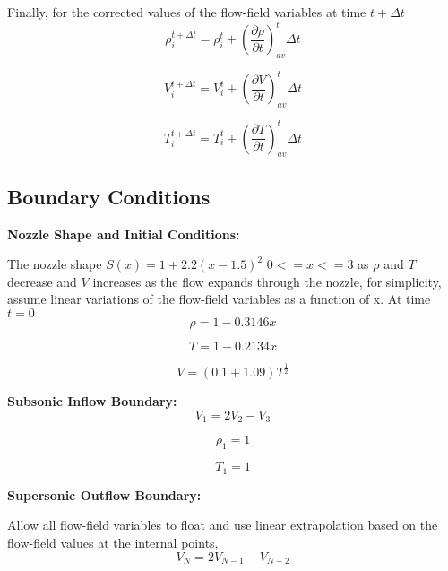 Finally, for the corrected values of the flow-field variables at time $t+\Delta t$
\begin{equation}
\rho^{t+\Delta t}_i = \rho^t_i + (\frac{\partial \rho}{\partial t})^t_{av} \Delta t
\end{equation}

\begin{equation}
V^{t+\Delta t}_i = V^t_i + (\frac{\partial V}{\partial t})^t_{av} \Delta t
\end{equation}

\begin{equation}
T^{t+\Delta t}_i = T^t_i + (\frac{\partial T}{\partial t})^t_{av} \Delta t
\end{equation}

\subsection{Boundary Conditions}

\textbf{Nozzle Shape and Initial Conditions:}

The nozzle shape  $S(x)=1+2.2(x-1.5)^2$   $0<=x<=3$
as $\rho$ and $T$ decrease and $V$ increases as the flow expands through the nozzle, for simplicity, assume linear variations of the flow-field variables as a function of x.
At time $t=0$
\begin{equation}
\rho = 1-0.3146x
\end{equation}

\begin{equation}
T = 1-0.2134x
\end{equation}

\begin{equation}
V = (0.1+1.09)T^{\frac{1}{2}}
\end{equation}

\textbf{Subsonic Inflow Boundary:}
\begin{equation}
V_1=2V_2-V_3
\end{equation}

\begin{equation}
\rho_1 = 1
\end{equation}

\begin{equation}
T_1 = 1
\end{equation}

\textbf{Supersonic Outflow Boundary:}

Allow all flow-field variables to float and use linear extrapolation based on the flow-field values at the internal points,
\begin{equation}
V_N=2V_{N-1}-V_{N-2}
\end{equation}

